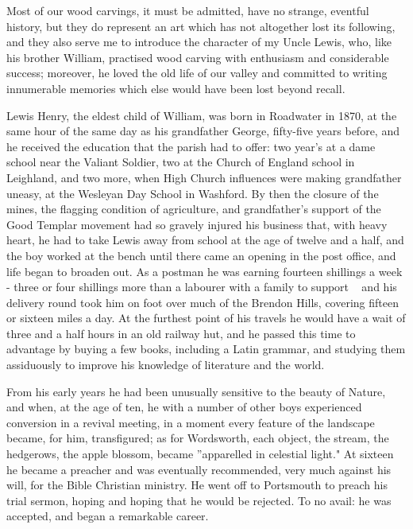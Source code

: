 
Most of our wood carvings, it must be admitted, have no strange, eventful history, but they do represent an art which has not altogether lost its following, and they also serve me to introduce the character of my Uncle Lewis, who, like his brother William, practised wood carving with enthusiasm and considerable success; moreover, he loved the old life of our valley and committed to writing innumerable memories which else would have been lost beyond recall.

Lewis Henry, the eldest child of William, was born in Roadwater in 1870, at the same hour of the same day as his grandfather George, fifty-five years before, and he received the education that the parish had to offer: two year's at a dame school near the Valiant Soldier, two at the Church of England school in Leighland, and two more, when High Church influences were making grandfather uneasy, at the Wesleyan Day School in Washford. By then the closure of the mines, the flagging condition of agriculture, and grandfather's support of the Good Templar movement had so gravely injured his business that, with heavy heart, he had to take Lewis away from school at the age of twelve and a half, and the boy worked at the bench until there came an opening in the post office, and life began to broaden out. As a postman he was earning fourteen shillings a week - three or four shillings more than a labourer with a family to support ~ and his delivery round took him on foot over much of the Brendon Hills, covering fifteen or sixteen miles a day. At the furthest point of his travels he would have a wait of three and a half hours in an old railway hut, and he passed this time to advantage by buying a few books, including a Latin grammar, and studying them assiduously to improve his knowledge of literature and the world.

From his early years he had been unusually sensitive to the beauty of Nature, and when, at the age of ten, he with a number of other boys experienced conversion in a revival meeting, in a moment every feature of the landscape became, for him, transfigured; as for Wordsworth, each object, the stream, the hedgerows, the apple blossom, became ”apparelled in celestial light." At sixteen he became a preacher and was eventually recommended, very much against his will, for the Bible Christian ministry. He went off to Portsmouth to preach his trial sermon, hoping and hoping that he would be rejected. To no avail: he was accepted, and began a remarkable career.

